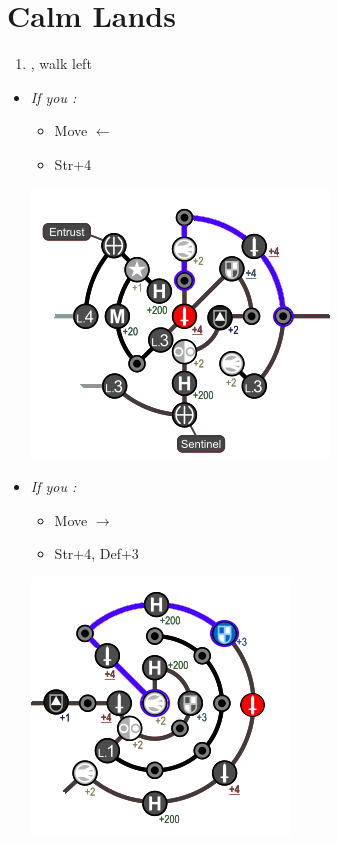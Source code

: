 \chapter{Calm Lands}

\begin{enumerate}
  \item \sd, walk left
\end{enumerate}
\begin{spheregrid}
  \begin{itemize}
  \yunaf
  \item \textit{If you \wonblitz:}
  \begin{itemize}
  \item Move $\leftarrow$
  \item Str+4
  \end{itemize}
  \includegraphics[width=.5\columnwidth]{graphics/yuna_blitz_win_2}
  \item \textit{If you \lostblitz:}
  \begin{itemize}
	\item Move $\rightarrow$
  	\item Str+4, Def+3
	\end{itemize}
  \includegraphics[width=.5\columnwidth]{graphics/yuna_blitz_loss_2}
\end{itemize}
\end{spheregrid}
